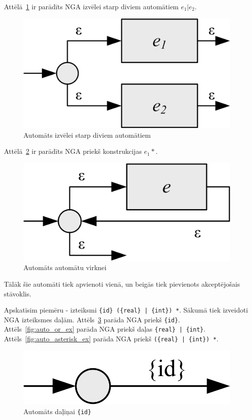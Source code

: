 Attēlā~\ref{fig:auto_or} ir parādīts NGA izvēlei starp diviem automātiem $e_1 | e_2$.
\begin{figure}[H]
  \centering
    \includegraphics[scale=1.5]{pictures/auto_or}
  \caption{\label{fig:auto_or}Automāts izvēlei starp diviem automātiem}
\end{figure}

Attēlā~\ref{fig:auto_asterisk} ir parādīts NGA priekš konstrukcijas $e_1 *$.
\begin{figure}[H]
  \centering
    \includegraphics[scale=1.5]{pictures/auto_asterisk}
  \caption{\label{fig:auto_asterisk}Automāts automātu virknei}
\end{figure}

Tālāk šie automāti tiek apvienoti vienā, un beigās tiek pievienots akceptējošais stāvoklis.

Apskatīsim piemēru - izteiksmi \verb/{id} ({real} | {int}) */. Sākumā tiek izveidoti NGA izteiksmes daļām. Attēls~\ref{fig:auto_token_id} parāda NGA priekš \verb|{id}|. Attēls~\ref{fig:auto_or_ex} parāda NGA priekš daļas \verb/{real} | {int}/. Attēls~\ref{fig:auto_asterisk_ex} parāda NGA priekš \verb/({real} | {int}) */.

\begin{figure}[H]
  \centering
    \includegraphics[scale=1.5]{pictures/auto_token_id}
  \caption{\label{fig:auto_token_id}Automāts daļiņai \texttt{\{id\}}}
\end{figure}

